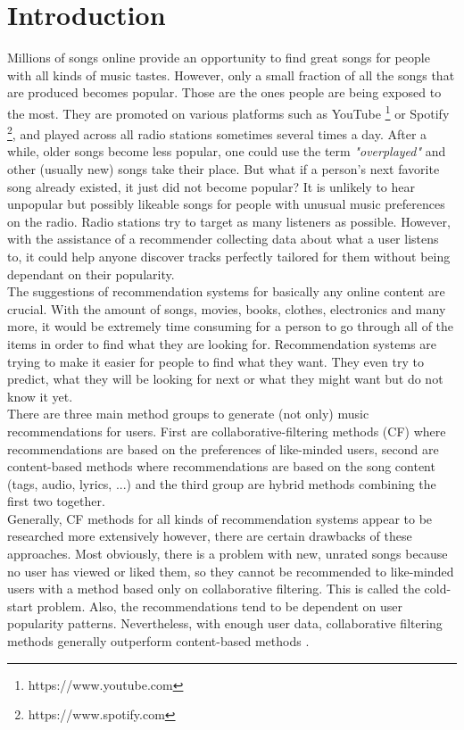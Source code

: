 \chapter*{Introduction}
Millions of songs online provide an opportunity to find great songs for people with all kinds of music tastes. However, only a small fraction of all the songs that are produced becomes popular. Those are the ones people are being exposed to the most. They are promoted on various platforms such as YouTube \footnote{https://www.youtube.com} or Spotify \footnote{https://www.spotify.com}, and played across all radio stations sometimes several times a day. After a while, older songs become less popular, one could use the term \textit{"overplayed"} and other (usually new) songs take their place. But what if a person's next favorite song already existed, it just did not become popular? It is unlikely to hear unpopular but possibly likeable songs for people with unusual music preferences on the radio. Radio stations try to target as many listeners as possible. However, with the assistance of a recommender collecting data about what a user listens to, it could help anyone discover tracks perfectly tailored for them without being dependant on their popularity.\\
The suggestions of recommendation systems for basically any online content are crucial. With the amount of songs, movies, books, clothes, electronics and many more, it would be extremely time consuming for a person to go through all of the items in order to find what they are looking for. Recommendation systems are trying to make it easier for people to find what they want. They even try to predict, what they will be looking for next or what they might want but do not know it yet. \\
There are three main method groups to generate (not only) music recommendations for users. First are collaborative-filtering methods (CF) where recommendations are based on the preferences of like-minded users, second are content-based methods where recommendations are based on the song content (tags, audio, lyrics, ...) and the third group are hybrid methods combining the first two together. \\
Generally, CF methods for all kinds of recommendation systems appear to be researched more extensively \cite{DBLP:journals/corr/abs-1712-07525} however, there are certain drawbacks of these approaches. Most obviously, there is a problem with new, unrated songs because no user has viewed or liked them, so they cannot be recommended to like-minded users with a method based only on collaborative filtering. This is called the cold-start problem. Also, the recommendations tend to be dependent on user popularity patterns. Nevertheless, with enough user data, collaborative filtering methods generally outperform content-based methods \cite{van2013deep}. \\
